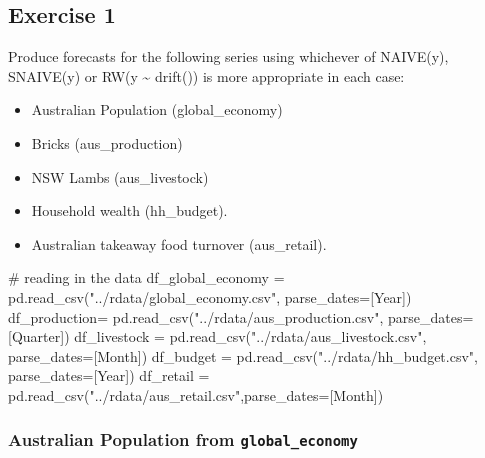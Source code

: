 \documentclass[
  11pt,
]{article}
\newenvironment{Shaded}{\begin{snugshade}}{\end{snugshade}}
\newcommand{\CommentTok}[1]{\textcolor[rgb]{0.37,0.37,0.37}{#1}}
\newcommand{\NormalTok}[1]{\textcolor[rgb]{0.00,0.23,0.31}{#1}}
\newcommand{\OperatorTok}[1]{\textcolor[rgb]{0.37,0.37,0.37}{#1}}
\newcommand{\StringTok}[1]{\textcolor[rgb]{0.13,0.47,0.30}{#1}}
\begin{document}
\subsection{Exercise 1}\label{exercise-1}

Produce forecasts for the following series using whichever of NAIVE(y),
SNAIVE(y) or RW(y \textasciitilde{} drift()) is more appropriate in each
case:

\begin{itemize}
\item
  Australian Population (global\_economy)
\item
  Bricks (aus\_production)
\item
  NSW Lambs (aus\_livestock)
\item
  Household wealth (hh\_budget).
\item
  Australian takeaway food turnover (aus\_retail).
\end{itemize}

\begin{Shaded}
\begin{Highlighting}[]
\CommentTok{\# reading in the data}
\NormalTok{df\_global\_economy }\OperatorTok{=}\NormalTok{ pd.read\_csv(}\StringTok{"../rdata/global\_economy.csv"}\NormalTok{, parse\_dates}\OperatorTok{=}\NormalTok{[}\StringTok{\textquotesingle{}Year\textquotesingle{}}\NormalTok{])}
\NormalTok{df\_production}\OperatorTok{=}\NormalTok{ pd.read\_csv(}\StringTok{"../rdata/aus\_production.csv"}\NormalTok{, parse\_dates}\OperatorTok{=}\NormalTok{[}\StringTok{\textquotesingle{}Quarter\textquotesingle{}}\NormalTok{])}
\NormalTok{df\_livestock }\OperatorTok{=}\NormalTok{ pd.read\_csv(}\StringTok{"../rdata/aus\_livestock.csv"}\NormalTok{, parse\_dates}\OperatorTok{=}\NormalTok{[}\StringTok{\textquotesingle{}Month\textquotesingle{}}\NormalTok{])}
\NormalTok{df\_budget }\OperatorTok{=}\NormalTok{ pd.read\_csv(}\StringTok{"../rdata/hh\_budget.csv"}\NormalTok{, parse\_dates}\OperatorTok{=}\NormalTok{[}\StringTok{\textquotesingle{}Year\textquotesingle{}}\NormalTok{])}
\NormalTok{df\_retail }\OperatorTok{=}\NormalTok{ pd.read\_csv(}\StringTok{"../rdata/aus\_retail.csv"}\NormalTok{,parse\_dates}\OperatorTok{=}\NormalTok{[}\StringTok{\textquotesingle{}Month\textquotesingle{}}\NormalTok{])}
\end{Highlighting}
\end{Shaded}

\subsubsection{\texorpdfstring{Australian Population from
\texttt{global\_economy}}{Australian Population from global\_economy}}\label{australian-population-from-global_economy}
\end{document}
